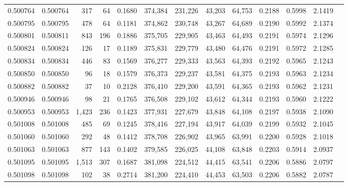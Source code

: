 \begin{tabular}{rrrrrrrrrrrrr}
0.500764 & 0.500764 &   317 &    64 &                                     0.1680 & 374,384 & 231,226 &  43,203 &  64,753 & 0.2188 & 0.5998 & 2.1419 \\
0.500795 & 0.500795 &   478 &    64 &                                     0.1181 & 374,862 & 230,748 &  43,267 &  64,689 & 0.2190 & 0.5992 & 2.1374 \\
0.500801 & 0.500811 &   843 &   196 &                                     0.1886 & 375,705 & 229,905 &  43,463 &  64,493 & 0.2191 & 0.5974 & 2.1296 \\
0.500824 & 0.500824 &   126 &    17 &                                     0.1189 & 375,831 & 229,779 &  43,480 &  64,476 & 0.2191 & 0.5972 & 2.1285 \\
0.500834 & 0.500834 &   446 &    83 &                                     0.1569 & 376,277 & 229,333 &  43,563 &  64,393 & 0.2192 & 0.5965 & 2.1243 \\
0.500850 & 0.500850 &    96 &    18 &                                     0.1579 & 376,373 & 229,237 &  43,581 &  64,375 & 0.2193 & 0.5963 & 2.1234 \\
0.500882 & 0.500882 &    37 &    10 &                                     0.2128 & 376,410 & 229,200 &  43,591 &  64,365 & 0.2193 & 0.5962 & 2.1231 \\
0.500946 & 0.500946 &    98 &    21 &                                     0.1765 & 376,508 & 229,102 &  43,612 &  64,344 & 0.2193 & 0.5960 & 2.1222 \\
0.500953 & 0.500953 & 1,423 &   236 &                                     0.1423 & 377,931 & 227,679 &  43,848 &  64,108 & 0.2197 & 0.5938 & 2.1090 \\
0.501008 & 0.501008 &   485 &    69 &                                     0.1245 & 378,416 & 227,194 &  43,917 &  64,039 & 0.2199 & 0.5932 & 2.1045 \\
0.501060 & 0.501060 &   292 &    48 &                                     0.1412 & 378,708 & 226,902 &  43,965 &  63,991 & 0.2200 & 0.5928 & 2.1018 \\
0.501063 & 0.501063 &   877 &   143 &                                     0.1402 & 379,585 & 226,025 &  44,108 &  63,848 & 0.2203 & 0.5914 & 2.0937 \\
0.501095 & 0.501095 & 1,513 &   307 &                                     0.1687 & 381,098 & 224,512 &  44,415 &  63,541 & 0.2206 & 0.5886 & 2.0797 \\
0.501098 & 0.501098 &   102 &    38 &                                     0.2714 & 381,200 & 224,410 &  44,453 &  63,503 & 0.2206 & 0.5882 & 2.0787 \\

\end{tabular}

